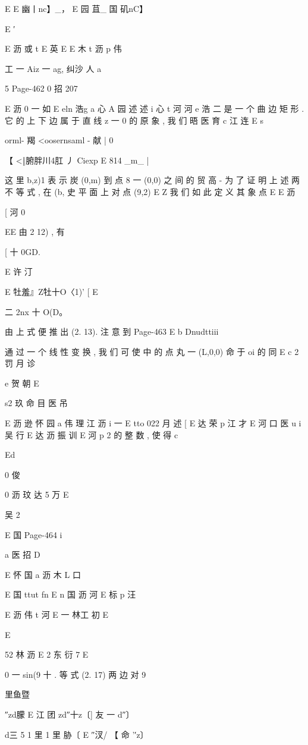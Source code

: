 {{{{E
E
幽丨nc】_， E 园 苴_ 国 矶nC】

E ′

E 沥 或 t
E 英
E
E 木 t 沥 p
伟

工 一 Aiz 一 ag,
纠沙 人 a

5
Page-462
0 招 207

E 沥 0 一 如
E eln 浩g a 心 A
园 述
述 i 心 t 河 河 e 浩
二 是 一 个 曲 边 矩 形 . 它 的 上 下 边 属 于 直 线 {z 一 0} 的 原 象 , 我 们 晤
医 育 c 江 连 E s

orml- 羯 <oosernsaml - 献 |
0

【 <‖腑胖川4肛 丿 Ciexp E 814
_m_ |

这 里 b,z)1 表 示 炭 (0,m) 到 点 8 一 (0,0) 之 间 的 贸 高 - 为 了 证 明 上
述 两 不 等 式 , 在 (b, 史 平 面 上 对 点 (9,2) E Z 我 们 如 此 定 义 其 象 点
E
E 沥

[ 河 0

EE
由 2 12) , 有

[  十 0GD.

E
许 汀

E 牡羞』Z牡十O〈1)' [
E

二 2nx 十 O(D。

由 上 式 便 推 出 (2. 13). 注 意 到
Page-463
E b
Dnudttiii

通 过 一 个 线 性 变 换 , 我 们 可 使 中 的 点 丸 一 (L,0,0) 命 于 oi 的 同
E
c 2 罚 月 诊

e 贺 朝
E

s2 玖 命 目 医 吊

E 沥 逊 怀
园 a 伟 理 江
沥 i 一
E
tto 022
月 述
[
E 达 荣 p 江 才
E 河 口
医 u i 吴 行
E 达 沥 振 训
E 河 p 2
的 整 数 , 使 得
c

Ed

0 俊

0 沥 玟 达 5 万
E

吴
2

E 国
Page-464
i

a
医 招
D

E 怀 国 a 沥 木
L 口

E 国 ttut fn
E n 国 沥 河
E 标 p 汪

E 沥 伟 t 河
E 一
林工 初
E

E

52 林 沥 E 2 东 衍 7
E

0
一 sin(9 十 . 等 式 (2. 17) 两 边 对 9

里鱼暨

″zd朦
E 江
团 zd″十z〔] 友 一 d″〕

d三 5 1 里 1 里
胁〔 E ″汊/ 【 命 '′z〕

}}}}
